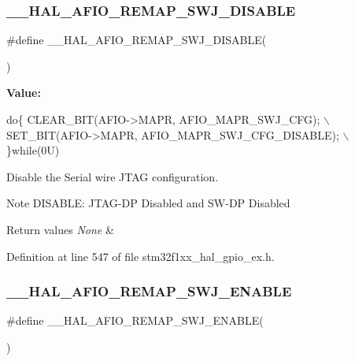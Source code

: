 \subsubsection{\texorpdfstring{\+\_\+\+\_\+\+H\+A\+L\+\_\+\+A\+F\+I\+O\+\_\+\+R\+E\+M\+A\+P\+\_\+\+S\+W\+J\+\_\+\+D\+I\+S\+A\+B\+LE}{\_\_HAL\_AFIO\_REMAP\_SWJ\_DISABLE}}
{\footnotesize\ttfamily \#define \+\_\+\+\_\+\+H\+A\+L\+\_\+\+A\+F\+I\+O\+\_\+\+R\+E\+M\+A\+P\+\_\+\+S\+W\+J\+\_\+\+D\+I\+S\+A\+B\+LE(\begin{DoxyParamCaption}{ }\end{DoxyParamCaption})}

{\bfseries Value\+:}
\begin{DoxyCode}
\textcolor{keywordflow}{do}\{ CLEAR\_BIT(AFIO->MAPR, AFIO\_MAPR\_SWJ\_CFG);         \(\backslash\)
                                            SET\_BIT(AFIO->MAPR, AFIO\_MAPR\_SWJ\_CFG\_DISABLE);   \(\backslash\)
                                          \}\textcolor{keywordflow}{while}(0U)
\end{DoxyCode}


Disable the Serial wire J\+T\+AG configuration. 

\begin{DoxyNote}{Note}
D\+I\+S\+A\+B\+LE\+: J\+T\+A\+G-\/\+DP Disabled and S\+W-\/\+DP Disabled 
\end{DoxyNote}

\begin{DoxyRetVals}{Return values}
{\em None} & \\
\hline
\end{DoxyRetVals}


Definition at line 547 of file stm32f1xx\+\_\+hal\+\_\+gpio\+\_\+ex.\+h.

\mbox{\label{group___g_p_i_o_ex___a_f_i_o___a_f___r_e_m_a_p_p_i_n_g_ga9e3b30234057b920408944eecfbd1e40}} 
\subsubsection{\texorpdfstring{\+\_\+\+\_\+\+H\+A\+L\+\_\+\+A\+F\+I\+O\+\_\+\+R\+E\+M\+A\+P\+\_\+\+S\+W\+J\+\_\+\+E\+N\+A\+B\+LE}{\_\_HAL\_AFIO\_REMAP\_SWJ\_ENABLE}}
{\footnotesize\ttfamily \#define \+\_\+\+\_\+\+H\+A\+L\+\_\+\+A\+F\+I\+O\+\_\+\+R\+E\+M\+A\+P\+\_\+\+S\+W\+J\+\_\+\+E\+N\+A\+B\+LE(\begin{DoxyParamCaption}{ }\end{DoxyParamCaption})}

